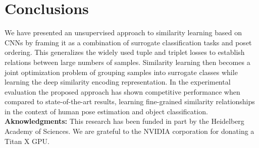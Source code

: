 \documentclass[10pt,twocolumn,letterpaper]{article}
\begin{document}
\section{Conclusions}
We have presented an unsupervised approach to similarity learning based on CNNs by framing it as a combination of surrogate classification tasks and poset ordering. This generalizes the widely used tuple and triplet losses to establish relations between large numbers of samples. Similarity learning then becomes a joint optimization problem of grouping samples into surrogate classes while learning the deep similarity encoding representation. In the experimental evaluation the proposed approach has shown competitive performance when compared to state-of-the-art results, learning fine-grained similarity relationships in the context of human pose estimation and object classification.\\


\noindent\textbf{Aknowledgments:} This research has been funded in part by the Heidelberg Academy of Sciences. We are grateful to the NVIDIA corporation for donating a Titan X GPU.



\end{document}
